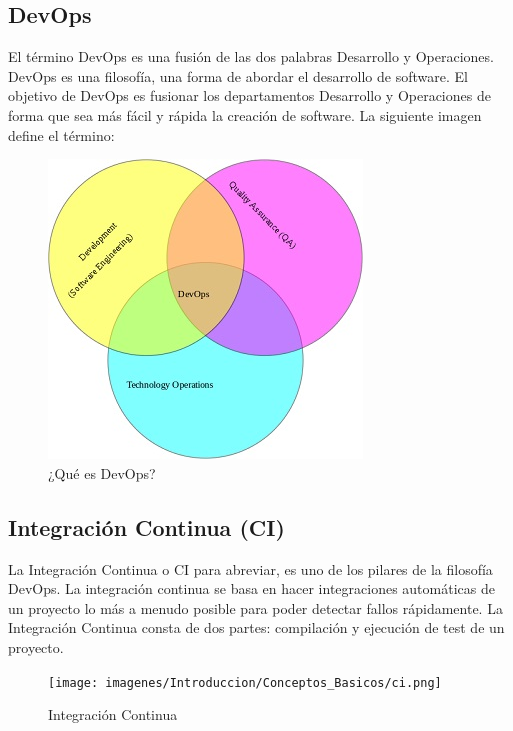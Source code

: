 	\subsection{DevOps}
		\begin{text}
			El término DevOps es una fusión de las dos palabras Desarrollo y Operaciones. DevOps es una filosofía, una forma de abordar el desarrollo de software. El objetivo de DevOps es fusionar los departamentos Desarrollo y Operaciones de forma que sea más fácil y rápida la creación de software. La siguiente imagen define el término:
			
			\begin{figure}[!hbt]
				\centering
				\includegraphics[scale=0.75]{imagenes/Introduccion/Conceptos_Basicos/devops.jpg}
				\caption[¿Qué es DevOps?]{¿Qué es DevOps? \cite{WhatIsDe1:online}}
				\label{termino_devops}
			\end{figure}
			 
		\end{text}
	\subsection{Integración Continua (CI)}
		\begin{text}
			La Integración Continua o CI para abreviar, es uno de los pilares de la filosofía DevOps. La integración continua se basa en hacer integraciones automáticas de un proyecto lo más a menudo posible para poder detectar fallos rápidamente. La Integración Continua consta de dos partes: compilación y ejecución de test de un proyecto.
			
			\begin{figure}[!hbt]
				\centering
				\texttt{[image: imagenes/Introduccion/Conceptos\_Basicos/ci.png]}
				\caption[Integración Continua]{Integración Continua \cite{Alcanzan90:online} }
				\label{integracion_continua} 
			\end{figure}
		\end{text}
